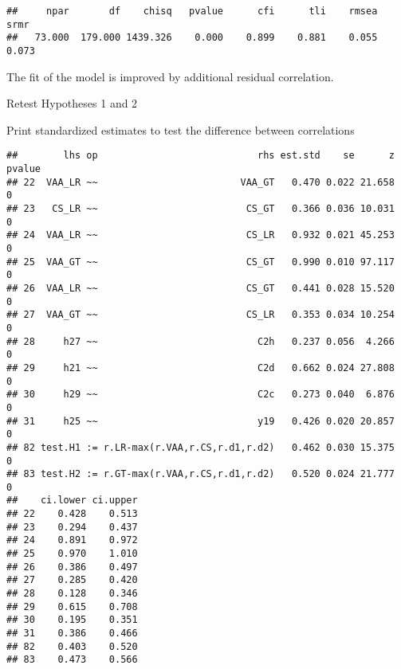 \documentclass[
]{article}
\newenvironment{Shaded}{\begin{snugshade}}{\end{snugshade}}
\newcommand{\KeywordTok}[1]{\textcolor[rgb]{0.13,0.29,0.53}{\textbf{#1}}}
\newcommand{\NormalTok}[1]{#1}
\newcommand{\OperatorTok}[1]{\textcolor[rgb]{0.81,0.36,0.00}{\textbf{#1}}}
\newcommand{\StringTok}[1]{\textcolor[rgb]{0.31,0.60,0.02}{#1}}
\begin{document}
\begin{verbatim}
##     npar       df    chisq   pvalue      cfi      tli    rmsea     srmr 
##   73.000  179.000 1439.326    0.000    0.899    0.881    0.055    0.073
\end{verbatim}

The fit of the model is improved by additional residual correlation.

Retest Hypotheses 1 and 2

Print standardized estimates to test the difference between correlations

\begin{Shaded}
\end{Shaded}

\begin{verbatim}
##        lhs op                            rhs est.std    se      z pvalue
## 22  VAA_LR ~~                         VAA_GT   0.470 0.022 21.658      0
## 23   CS_LR ~~                          CS_GT   0.366 0.036 10.031      0
## 24  VAA_LR ~~                          CS_LR   0.932 0.021 45.253      0
## 25  VAA_GT ~~                          CS_GT   0.990 0.010 97.117      0
## 26  VAA_LR ~~                          CS_GT   0.441 0.028 15.520      0
## 27  VAA_GT ~~                          CS_LR   0.353 0.034 10.254      0
## 28     h27 ~~                            C2h   0.237 0.056  4.266      0
## 29     h21 ~~                            C2d   0.662 0.024 27.808      0
## 30     h29 ~~                            C2c   0.273 0.040  6.876      0
## 31     h25 ~~                            y19   0.426 0.020 20.857      0
## 82 test.H1 := r.LR-max(r.VAA,r.CS,r.d1,r.d2)   0.462 0.030 15.375      0
## 83 test.H2 := r.GT-max(r.VAA,r.CS,r.d1,r.d2)   0.520 0.024 21.777      0
##    ci.lower ci.upper
## 22    0.428    0.513
## 23    0.294    0.437
## 24    0.891    0.972
## 25    0.970    1.010
## 26    0.386    0.497
## 27    0.285    0.420
## 28    0.128    0.346
## 29    0.615    0.708
## 30    0.195    0.351
## 31    0.386    0.466
## 82    0.403    0.520
## 83    0.473    0.566
\end{verbatim}
\end{document}

